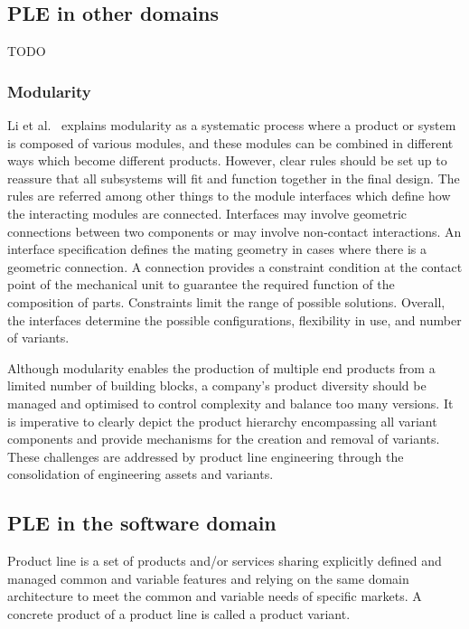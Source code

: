 \documentclass[sigconf,review]{acmart}
\begin{document}
\subsection{PLE in other domains}
\label{sec:modualarity}

TODO

\subsubsection{Modularity}

Li et al.~\cite{Li_2019} explains modularity as a systematic process where a product or system is composed of various modules, and these modules can be combined in different ways which become different products. 
However, clear rules should be set up to reassure that all subsystems will fit and function together in the final design.
The rules are referred among other things to the module interfaces which define how the interacting modules are connected.
Interfaces may involve geometric connections between two components or may involve non-contact interactions. An interface specification defines the mating geometry in cases where there is a geometric connection.
A connection provides a constraint condition at the contact point of the mechanical unit to guarantee the required function of the composition of parts.
Constraints limit the range of possible solutions.
Overall, the interfaces determine the possible configurations, flexibility in use, and number of variants. 

Although modularity enables the production of  multiple end products from a limited number of building blocks, a company's product diversity should be managed and optimised to control complexity and balance too many versions. 
It is imperative to clearly depict the product hierarchy encompassing all variant components and provide mechanisms for the creation and removal of variants. 
These challenges are addressed by product line engineering through the consolidation of engineering assets and variants.

\subsection{PLE in the software domain}
\label{sec:product line engineering}


Product line is a set of products and/or services sharing explicitly defined and managed common and variable features and relying on the same domain architecture to meet the common and variable needs of specific markets.
A concrete product of a product line is called a product variant.
\end{document}
